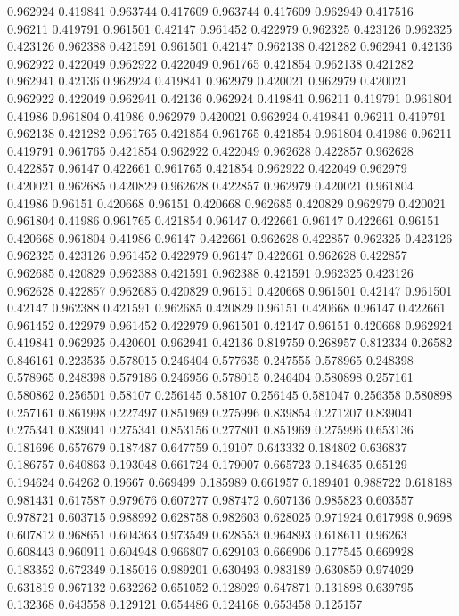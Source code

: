 0.962924 0.419841
0.963744 0.417609
0.963744 0.417609
0.962949 0.417516
0.96211 0.419791
0.961501 0.42147
0.961452 0.422979
0.962325 0.423126
0.962325 0.423126
0.962388 0.421591
0.961501 0.42147
0.962138 0.421282
0.962941 0.42136
0.962922 0.422049
0.962922 0.422049
0.961765 0.421854
0.962138 0.421282
0.962941 0.42136
0.962924 0.419841
0.962979 0.420021
0.962979 0.420021
0.962922 0.422049
0.962941 0.42136
0.962924 0.419841
0.96211 0.419791
0.961804 0.41986
0.961804 0.41986
0.962979 0.420021
0.962924 0.419841
0.96211 0.419791
0.962138 0.421282
0.961765 0.421854
0.961765 0.421854
0.961804 0.41986
0.96211 0.419791
0.961765 0.421854
0.962922 0.422049
0.962628 0.422857
0.962628 0.422857
0.96147 0.422661
0.961765 0.421854
0.962922 0.422049
0.962979 0.420021
0.962685 0.420829
0.962628 0.422857
0.962979 0.420021
0.961804 0.41986
0.96151 0.420668
0.96151 0.420668
0.962685 0.420829
0.962979 0.420021
0.961804 0.41986
0.961765 0.421854
0.96147 0.422661
0.96147 0.422661
0.96151 0.420668
0.961804 0.41986
0.96147 0.422661
0.962628 0.422857
0.962325 0.423126
0.962325 0.423126
0.961452 0.422979
0.96147 0.422661
0.962628 0.422857
0.962685 0.420829
0.962388 0.421591
0.962388 0.421591
0.962325 0.423126
0.962628 0.422857
0.962685 0.420829
0.96151 0.420668
0.961501 0.42147
0.961501 0.42147
0.962388 0.421591
0.962685 0.420829
0.96151 0.420668
0.96147 0.422661
0.961452 0.422979
0.961452 0.422979
0.961501 0.42147
0.96151 0.420668
0.962924 0.419841
0.962925 0.420601
0.962941 0.42136
0.819759 0.268957
0.812334 0.26582
0.846161 0.223535
0.578015 0.246404
0.577635 0.247555
0.578965 0.248398
0.578965 0.248398
0.579186 0.246956
0.578015 0.246404
0.580898 0.257161
0.580862 0.256501
0.58107 0.256145
0.58107 0.256145
0.581047 0.256358
0.580898 0.257161
0.861998 0.227497
0.851969 0.275996
0.839854 0.271207
0.839041 0.275341
0.839041 0.275341
0.853156 0.277801
0.851969 0.275996
0.653136 0.181696
0.657679 0.187487
0.647759 0.19107
0.643332 0.184802
0.636837 0.186757
0.640863 0.193048
0.661724 0.179007
0.665723 0.184635
0.65129 0.194624
0.64262 0.19667
0.669499 0.185989
0.661957 0.189401
0.988722 0.618188
0.981431 0.617587
0.979676 0.607277
0.987472 0.607136
0.985823 0.603557
0.978721 0.603715
0.988992 0.628758
0.982603 0.628025
0.971924 0.617998
0.9698 0.607812
0.968651 0.604363
0.973549 0.628553
0.964893 0.618611
0.96263 0.608443
0.960911 0.604948
0.966807 0.629103
0.666906 0.177545
0.669928 0.183352
0.672349 0.185016
0.989201 0.630493
0.983189 0.630859
0.974029 0.631819
0.967132 0.632262
0.651052 0.128029
0.647871 0.131898
0.639795 0.132368
0.643558 0.129121
0.654486 0.124168
0.653458 0.125157
